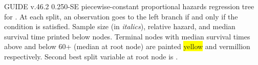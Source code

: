 \documentclass[12pt]{article}
\begin{document}
 \begin{center}
 \end{center}
GUIDE v.46.2 0.250-SE
piecewise-constant proportional hazards regression tree
for \texttt{}.
At each split, an observation goes to the left branch 
 if and only if the condition is satisfied.
Sample size (in \emph{italics}), relative hazard, and median survival time printed below nodes.
 Terminal nodes with median survival times above and below 60+ (median at root node) are painted \colorbox{yellow}{yellow} and \colorbox{vermillion}{vermillion} respectively.
 Second best split variable at root node is \texttt{}.
 
\end{document}
